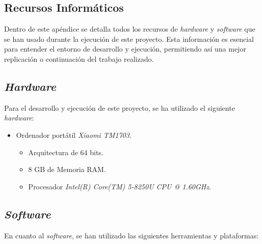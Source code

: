 \begin{appendices}

\chapter{Recursos Informáticos} \label{chap:recursos}

Dentro de este apéndice se detalla todos los recursos de \textit{hardware} y \textit{software} que se han usado durante la ejecución de este proyecto. Esta información es esencial para entender el entorno de desarrollo y ejecución, permitiendo así una mejor replicación o continuación del trabajo realizado.
    
\section{\textit{Hardware}}

Para el desarrollo y ejecución de este proyecto, se ha utilizado el siguiente \textit{hardware}:

\begin{itemize}
    \item Ordenador portátil \textit{Xiaomi TM1703}.
    \begin{itemize}
    \item Arquitectura de 64 bits.
    \item 8 GB de Memoria RAM.
    \item Procesador \textit{ Intel(R) Core(TM) 5-8250U CPU @ 1.60GHz}.
    \end{itemize}
\end{itemize}

\section{\textit{Software}}

En cuanto al \textit{software}, se han utilizado las siguientes herramientas y plataformas:


\end{appendices}
